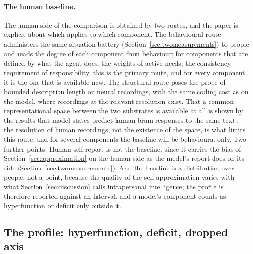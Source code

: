 \paragraph{The human baseline.}
\label{sec:baseline}
The human side of the comparison is obtained by two routes, and the paper is explicit about which
applies to which component. The behavioural route administers the same situation battery
(Section~\ref{sec:twomeasurements}) to people and reads the degree of each component from behaviour;
for components that are defined by what the agent does, the weights of active needs, the consistency
requirement of responsibility, this is the primary route, and for every component it is the one that
is available now. The structural route poses the probe of bounded description length on neural
recordings, with the same coding cost as on the model, where recordings at the relevant resolution
exist. That a common representational space between the two substrates is available at all is shown by
the results that model states predict human brain responses to the same text
\citep{schrimpf2021,goldstein2022,caucheteux2022}; the resolution of human recordings, not the
existence of the space, is what limits this route, and for several components the baseline will be
behavioural only. Two further points. Human self-report is not the baseline, since it carries the bias
of Section~\ref{sec:approximation} on the human side as the model's report does on its side
(Section~\ref{sec:twomeasurements}). And the baseline is a distribution over people, not a point,
because the quality of the self-approximation varies with what Section~\ref{sec:discussion} calls
intrapersonal intelligence; the profile is therefore reported against an interval, and a model's
component counts as hyperfunction or deficit only outside it.

\subsection{The profile: hyperfunction, deficit, dropped axis}
\label{sec:profile}


